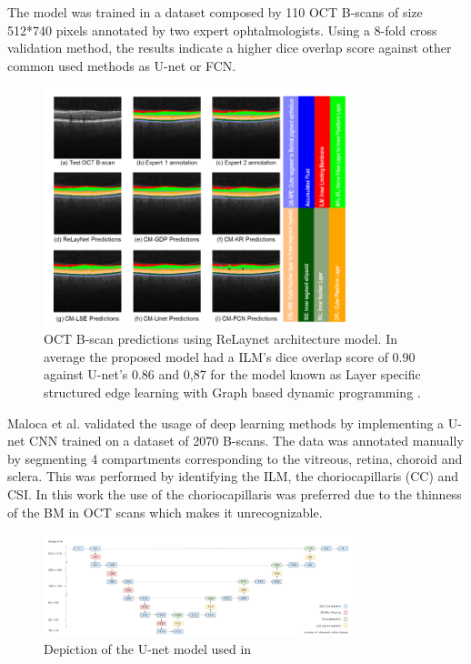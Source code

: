 \documentclass[12pt,a4paper]{scrartcl}
\begin{document}
The model was trained in a dataset composed by 110 OCT B-scans of size 512*740 pixels annotated by two expert ophtalmologists. Using a 8-fold cross validation method, the results indicate a higher dice overlap score against other common used methods as U-net or FCN.

\begin{figure}[H]
    \centering
    \includegraphics[width=0.8\textwidth]{./images/relaynet-predictions.png}
    \caption{OCT B-scan predictions using ReLaynet architecture model. In average the proposed model had a ILM's dice overlap score of 0.90 against U-net's 0.86 and 0,87 for the model known as Layer specific structured edge learning with  Graph based dynamic programming  \cite{Roy2017}.}
\end{figure}

Maloca et al. \cite{Maloca2019} validated the usage of deep learning methods by implementing a U-net CNN trained on a dataset of 2070 B-scans. The data was annotated manually by segmenting 4 compartments corresponding to the vitreous, retina, choroid and sclera. This was performed by identifying the ILM, the choriocapillaris (CC) and CSI. In this work the use of the choriocapillaris was preferred due to the thinness of the BM in OCT scans which makes it unrecognizable.

\begin{figure}[H]
    \centering
    \includegraphics[width=0.8\textwidth]{./images/maloca-unet.png}
    \caption{Depiction of the U-net model used in \cite{Maloca2019}}
\end{figure}
\end{document}
